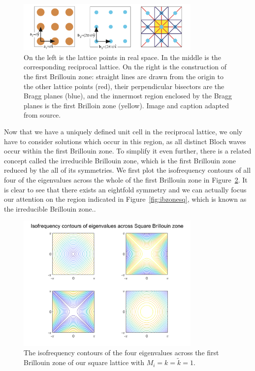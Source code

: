 \begin{figure}[!h]
\centering
\includegraphics[width=0.8\textwidth]{imgs/bzonesq.png}
\caption{\label{fig:bzonesq} On the left is the lattice points in real space.
    In the middle is the corresponding reciprocal lattice. On the right is the
    construction of the first Brillouin zone: straight lines are drawn from the
    origin to the other lattice points (red), their perpendicular bisectors are
    the Bragg planes (blue), and the innermost region enclosed by the Bragg
    planes is the first Brilloin zone (yellow). Image and caption adapted from
    source.\cite{moldinglight}}
\end{figure}

Now that we have a uniquely defined unit cell in the reciprocal lattice, we
only have to consider solutions which occur in this region, as all distinct
Bloch waves occur within the first Brillouin zone. To simplify it even further,
there is a related concept called the irreducible Brillouin zone, which is the
first Brillouin zone reduced by the all of its symmetries. We first plot the
isofrequency contours of all four of the eigenvalues across the whole of the
first Brillouin zone in Figure~\ref{fig:sqisofreq}. It is clear to see that
there exists an eightfold symmetry and we can actually focus our attention on
the region indicated in Figure~\ref{fig:ibzonesq}, which is known as the
irreducible Brillouin zone..

\begin{figure}[!h]
\centering
\includegraphics[width=0.8\textwidth]{imgs/sqisofreq.png}
\caption{\label{fig:sqisofreq} The isofrequency contours of the four
  eigenvalues across the first Brillouin zone of our square lattice with
  $M_i=k=\tilde{k}=1$.}
\end{figure}

